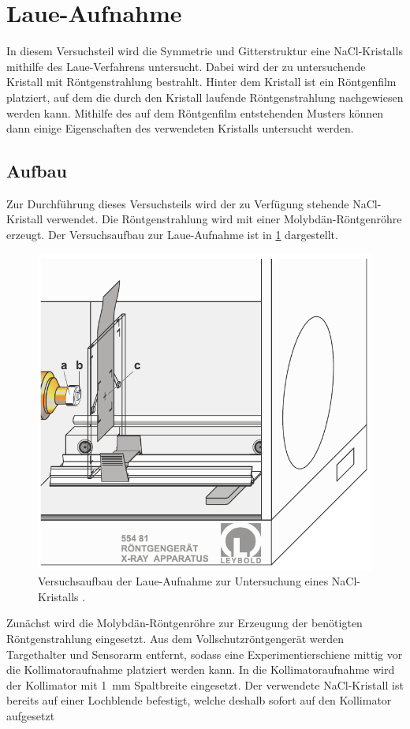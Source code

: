 \section{Laue-Aufnahme}\label{sec:laue}
In diesem Versuchsteil wird die Symmetrie und Gitterstruktur eine NaCl-Kristalls mithilfe des Laue-Verfahrens untersucht. Dabei wird der zu
untersuchende Kristall mit Röntgenstrahlung bestrahlt. Hinter dem Kristall ist ein Röntgenfilm platziert, auf dem die durch den Kristall laufende
Röntgenstrahlung nachgewiesen werden kann. Mithilfe des auf dem Röntgenfilm entstehenden Musters können dann einige Eigenschaften des verwendeten
Kristalls untersucht werden.
\subsection{Aufbau}\label{subsec:laue_aufbau}
Zur Durchführung dieses Versuchsteils wird der zu Verfügung stehende NaCl-Kristall verwendet. Die Röntgenstrahlung wird mit einer Molybdän-Röntgenröhre
erzeugt. Der Versuchsaufbau zur Laue-Aufnahme ist in \cref{fig:aufbau_laue} dargestellt.
\begin{figure}[H]
	\centering
	\includegraphics[width=0.6\linewidth]{../figs/aufbau_laue.png}
	\caption{Versuchsaufbau der Laue-Aufnahme zur Untersuchung eines NaCl-Kristalls \cite{laue_handblatt}.}
	\label{fig:aufbau_laue}
\end{figure} Zunächst wird die Molybdän-Röntgenröhre zur Erzeugung der benötigten Röntgenstrahlung eingesetzt. Aus dem Vollschutzröntgengerät werden Targethalter
und Sensorarm entfernt, sodass eine Experimentierschiene mittig vor die Kollimatoraufnahme platziert werden kann. In die Kollimatoraufnahme wird der Kollimator
mit \SI{1}{\milli \meter} Spaltbreite eingesetzt. Der verwendete NaCl-Kristall ist bereits auf einer Lochblende befestigt, welche deshalb sofort auf den Kollimator aufgesetzt
